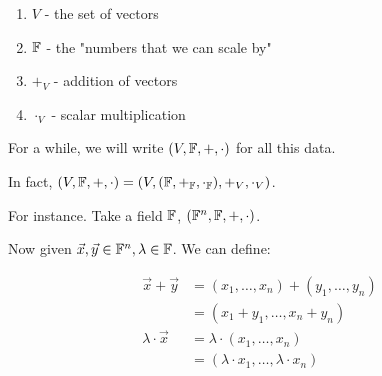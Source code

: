 {{\begin{enumerate}[label=(\alph*)]
	\item \(V\) - the set of vectors
	\item \(\FF\) - the "numbers that we can scale by"
	\item \(+_{V}\) - addition of vectors
	\item \(\cdot_{V}\) - scalar multiplication
\end{enumerate}

For a while, we will write \((V, \FF, +, \cdot )\) for all this data.

In fact, \((V, \FF, +, \cdot ) = (V, (\FF, +_{\FF}, \cdot_{\FF}), +_{V}, \cdot_{V})\).
}

For instance. Take a field \(\FF\), \((\FF^{n}, \FF, +, \cdot )\).

Now given \(\vec{x}, \vec{y} \in \FF^{n}, \lambda \in \FF \). We can define:

\begin{align*}
	\vec{x} + \vec{y}     & = (x_1, \ldots, x_{n}) + (y_1, \ldots, y_{n})      \\
	                      & = (x_1 + y_1, \ldots, x_{n} + y_{n})               \\
	\lambda \cdot \vec{x} & = \lambda \cdot (x_1, \ldots, x_{n})               \\
	                      & = (\lambda \cdot x_1, \ldots, \lambda \cdot x_{n})
\end{align*}
}

